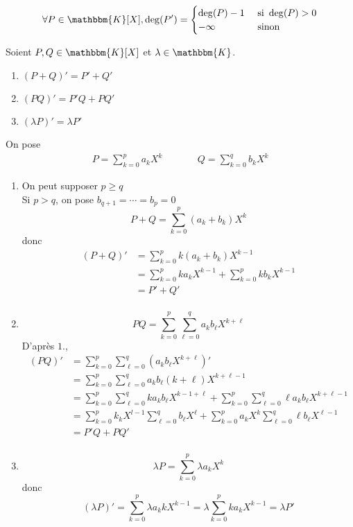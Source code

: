 \begin{prop}
	\[
		\forall P \in \mathbbm{K}[X], \deg(P') = \begin{cases}
			\deg(P) - 1 &\text{ si } \deg(P) > 0\\
			-\infty &\text{ sinon}
		\end{cases}
	\] 
\end{prop}

\begin{prop}
	Soient $P,Q \in \mathbbm{K}[X]$ et $\lambda \in \mathbbm{K}$.
	\begin{enumerate}
		\item $(P+Q)' = P' + Q'$ 
		\item $(PQ)' = P'Q + PQ'$ 
		\item $(\lambda P)' = \lambda P'$
	\end{enumerate}
\end{prop}

\begin{prv}
	On pose
	\begin{align*}
		P = \sum_{k=0}^{p} a_k X^k&\qquad&
		Q = \sum_{k=0}^{q} b_k X^k
	\end{align*}
	\begin{enumerate}
		\item On peut supposer $p \ge q$ \\
			Si $p > q$, on pose $b_{q+1} = \cdots = b_p = 0$ \\
			\[
				P + Q = \sum_{k=0}^p (a_k + b_k) X^k
			\] donc 
			\begin{align*}
				(P+Q)' &= \sum_{k=0}^p k(a_k + b_k) X^{k-1} \\
				&= \sum_{k=0}^p ka_kX^{k-1} + \sum_{k=0}^p kb_kX^{k-1} \\
				&= P' + Q' \\
			\end{align*}
		\item \[
				PQ = \sum_{k=0}^p \sum_{\ell=0}^q a_k b_\ell X^{k+\ell}
			\] D'après $1.$, 
			\begin{align*}
				(PQ)' &= \sum_{k=0}^p \sum_{\ell = 0}^q \left(a_k b_\ell X^{k+\ell}\right)'\\
				&= \sum_{k=0}^p \sum_{\ell = 0}^q a_k b_\ell (k+\ell) X^{k+\ell - 1}\\
				&= \sum_{k=0}^p \sum_{\ell=0}^q ka_k b_\ell X^{k-1+\ell} + \sum_{k=0}^p \sum_{\ell=0}^q \ell a_k b_\ell X^{k+\ell-1} \\
				&= \sum_{k=0}^p k_k X^{l-1}\sum_{\ell=0}^q b_\ell X^{\ell} + \sum_{k=0}^p a_k X^k \sum_{\ell=0}^q \ell b_\ell X^{\ell-1} \\
				&= P'Q+ PQ' \\
			\end{align*}
		\item \[
			\lambda P = \sum_{k=0}^p \lambda a_k X^{k}
		\] donc \[
			(\lambda P)' = \sum_{k=0}^p \lambda a_k k X^{k-1} = \lambda \sum_{k=0}^p k a_k X^{k-1} = \lambda P'
		\]
	\end{enumerate}
\end{prv}

